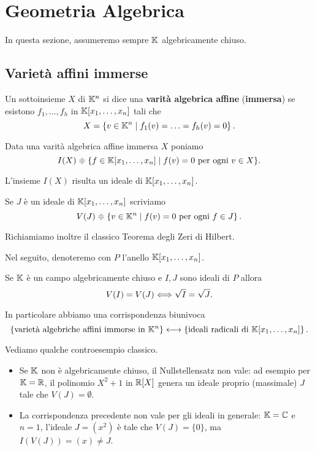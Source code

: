 \chapter{Geometria Algebrica}
In questa sezione, assumeremo sempre $\mathbb{K}$ algebricamente chiuso.

\section{Variet\`a affini immerse}
\begin{definition}
    Un sottoinsieme $X$ di $\mathbb{K}^n$ si dice una \textbf{varità algebrica affine} (\textbf{immersa}) se esistono $f_1,\dots,f_h$ in $\mathbb{K}[x_1,\dots,x_n]$ tali che 
	\[X=\left\{{v\in \mathbb{K}^n \mid f_1(v)=\ldots=f_h(v)=0}\right\}.\]
\end{definition}

\begin{notation}
Data una varità algebrica affine immersa $X$ poniamo
\[I(X)\doteqdot\{f\in \mathbb{K}[x_1,\dots,x_n] \mid f(v)=0 \text{ per ogni } v\in X  \}.\]
\end{notation}
\begin{remark}
L'insieme $I(X)$ risulta un ideale di $\mathbb{K}[x_1,\dots,x_n]$.
\end{remark}

\begin{notation}
Se $J$ è un ideale di $ \mathbb{K}[x_1,\dots,x_n]$ scriviamo \[V(J)\doteqdot\left\{v\in \mathbb{K}^n \mid f(v)=0 \text{ per ogni } f\in J\right\}.\]
\end{notation}

Richiamiamo inoltre il classico Teorema degli Zeri di Hilbert. 
\begin{notation}
    Nel seguito, denoteremo con $P$ l'anello $\mathbb{K}[x_1,\dots,x_n]$.
\end{notation}

\begin{theorem}[Nullstellensatz]
Se $\mathbb{K}$ \`e un campo algebricamente chiuso e $I,J$ sono ideali di $P$ allora 
\[V(I)=V(J)\Longleftrightarrow \sqrt I=\sqrt J.\]
\end{theorem}
In particolare abbiamo una corrispondenza biunivoca \[\left\{\text{varietà algebriche affini immerse in $\mathbb{K}^n$} \right\} \longleftrightarrow \left\{\text{ideali radicali di $\mathbb{K}[x_1,\dots,x_n]$}\right\}.\]

\begin{example} Vediamo qualche controesempio classico.
\begin{itemize}
    \item Se $\mathbb{K}$ non è algebricamente chiuso, il Nullstellensatz non vale: ad esempio per $\mathbb{K}=\mathbb{R}$, il polinomio $X^2+1$ in $\mathbb{R}[X]$ genera un ideale proprio (massimale) $J$ tale che $V(J)=\emptyset$.
    \item La corrispondenza precedente non vale per gli ideali in generale: $\mathbb{K}=\mathbb{C}$ e $n=1$, l'ideale $J=(x^2)$ è tale che $V(J)=\{0\}$, ma $I(V(J))=(x)\ne J$.
\end{itemize}
\end{example}

